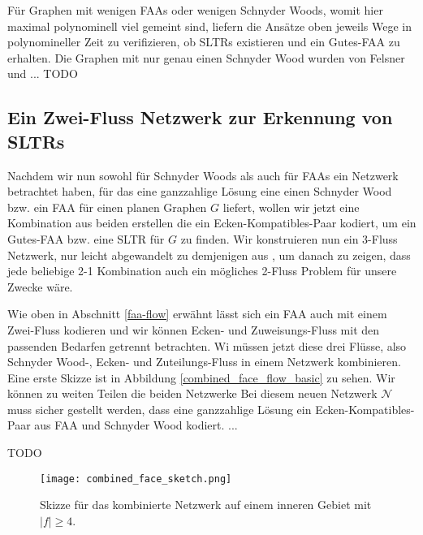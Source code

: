 

\begin{remark}
Für Graphen mit wenigen FAAs oder wenigen Schnyder Woods, womit hier maximal polynominell viel gemeint sind, liefern die Ansätze oben jeweils Wege in polynomineller Zeit zu verifizieren, ob SLTRs existieren und ein Gutes-FAA zu erhalten. Die Graphen mit nur genau einen Schnyder Wood wurden von Felsner und ... TODO 
\end{remark}

\subsection{Ein Zwei-Fluss Netzwerk zur Erkennung von SLTRs}

Nachdem wir nun sowohl für Schnyder Woods als auch für FAAs ein Netzwerk betrachtet haben, für das eine ganzzahlige Lösung eine einen Schnyder Wood bzw. ein FAA für einen planen Graphen $G$ liefert, wollen wir jetzt eine Kombination aus beiden erstellen die ein Ecken-Kompatibles-Paar kodiert, um ein Gutes-FAA bzw. eine SLTR für $G$ zu finden. Wir konstruieren nun ein 3-Fluss Netzwerk, nur leicht abgewandelt zu demjenigen aus \cite{af15}, um danach zu zeigen, dass jede beliebige 2-1 Kombination auch ein mögliches 2-Fluss Problem für unsere Zwecke wäre.\

Wie oben in Abschnitt \ref{faa-flow} erwähnt lässt sich ein FAA auch mit einem Zwei-Fluss kodieren und wir können Ecken- und Zuweisungs-Fluss mit den passenden Bedarfen getrennt betrachten. Wi müssen jetzt diese drei Flüsse, also Schnyder Wood-, Ecken- und Zuteilungs-Fluss in einem Netzwerk kombinieren. Eine erste Skizze ist in Abbildung \ref{combined_face_flow_basic} zu sehen. Wir können zu weiten Teilen die beiden Netzwerke 
Bei diesem neuen Netzwerk $\mathcal{N}$ muss sicher gestellt werden, dass eine ganzzahlige Lösung ein Ecken-Kompatibles-Paar aus FAA und Schnyder Wood kodiert. ... 

TODO 

\begin{figure}[h]
	\centering
  	\texttt{[image: combined\_face\_sketch.png]}
  	\caption{Skizze für das kombinierte Netzwerk auf einem inneren Gebiet mit $|f| \geq 4$.}
\end{figure}